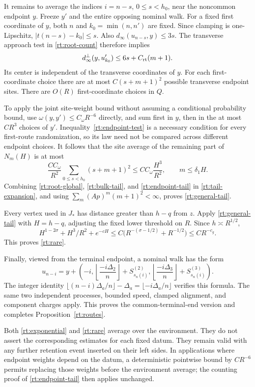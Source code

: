 It remains to average the indices \(i=n-s\), \(0\le s<h_0\),
near the noncommon endpoint \(y\).  Freeze \(y'\) and the entire
opposing nominal walk.  For a fixed first coordinate of \(y\), both
\(n\) and \(k_0=\min(n,n')\) are fixed.  Since clamping is
one-Lipschitz, \(|t(n-s)-k_0|\le s\).  Also
\(d_\infty(u_{n-s},y)\le3s\).  The transverse approach test in
\eqref{rt:root-count} therefore implies
\begin{equation}\label{rt:endpoint-test}
 d_\infty^\perp(y,u'_{k_0})\le6s+C_{\rm rt}(m+1).
\end{equation}
Its center is independent of the transverse coordinates of \(y\).
For each first-coordinate choice there are at most
\(C(s+m+1)^2\) possible transverse endpoint sites.  There are
\(O(R)\) first-coordinate choices in \(Q\).

To apply the joint site-weight bound without assuming a conditional
probability bound, use \(\omega(y,y')\le C_\omega R^{-6}\)
directly, and sum first in \(y\), then in the at most \(CR^3\)
choices of \(y'\).  Inequality~\eqref{rt:endpoint-test} is a
necessary condition for every first-route randomization, so its law
need not be compared across different endpoint choices.  It follows
that the site average of the remaining part of \(N_m(H)\) is at most
\begin{equation}\label{rt:endpoint-tail}
 \frac{CC_\omega}{R^2}
       \sum_{0\le s<h_0}(s+m+1)^2
 \le CC_\omega\frac{H^3}{R^2},\qquad m\le\delta_1H.
\end{equation}
Combining \eqref{rt:root-global}, \eqref{rt:bulk-tail}, and
\eqref{rt:endpoint-tail} in \eqref{rt:tail-expansion}, and using
\(\sum_m(Ap)^m(m+1)^2<\infty\), proves
\eqref{rt:general-tail}.

Every vertex used in \(J_*\) has distance greater than \(h-q\)
from \(z\).  Apply \eqref{rt:general-tail} with \(H=h-q\), adjusting
the fixed lower threshold on \(R\).  Since \(h\asymp R^{1/2}\),
\[
 H^{1-2\sigma}+H^3/R^2+e^{-cH}
 \le C\bigl(R^{-(\sigma-1/2)}+R^{-1/2}\bigr)
 \le CR^{-c_g}.
\]
This proves \eqref{rt:rare}.

Finally, viewed from the terminal endpoint, a nominal walk has the form
\[
 u_{n-i}=y+\left(-i,
       \left\lfloor\frac{-i\Delta_2}{n}\right\rfloor
                         +S^{(2)}_{s_n(i)},
       \left\lfloor\frac{-i\Delta_3}{n}\right\rfloor
                         +S^{(3)}_{s_n(i)}\right).
\]
The integer identity
\(\lfloor(n-i)\Delta_a/n\rfloor-\Delta_a
 =\lfloor-i\Delta_a/n\rfloor\) verifies this formula.  The same
two independent processes, bounded speed, clamped alignment, and
component charges apply.  This proves the common-terminal-end version
and completes Proposition~\ref{rt:routes}.

\begin{remark}\label{rt:averaging}
Both \eqref{rt:exponential} and \eqref{rt:rare} average over the
environment.  They do not assert the corresponding estimates for each
fixed datum.  They remain valid with any further retention event
inserted on their left sides.  In applications where endpoint weights
depend on the datum, a deterministic pointwise bound by
\(CR^{-6}\) permits replacing those weights before the environment
average; the counting proof of \eqref{rt:endpoint-tail} then applies
unchanged.
\end{remark}
